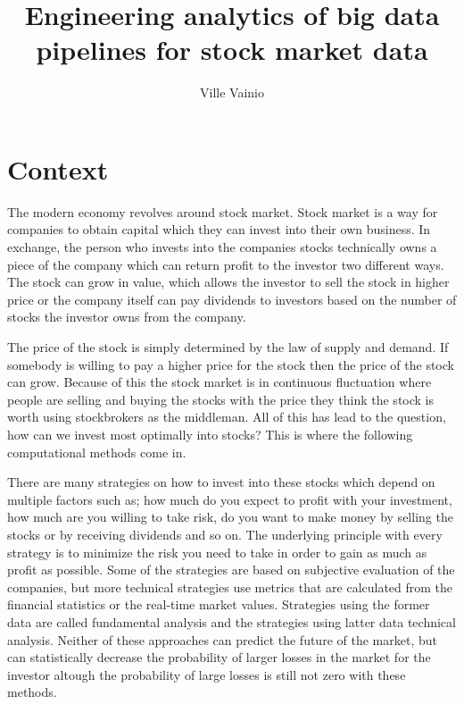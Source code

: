 \documentclass[article,11pt]{article}
\title{Engineering analytics of big data pipelines for stock market data}
\begin{document}
\author{Ville Vainio}
\maketitle

\section{Context}

The modern economy revolves around stock market.
Stock market is a way for companies to obtain capital which they can invest into their own business.
In exchange, the person who invests into the companies stocks technically owns a piece of the company which can return profit to the investor two different ways.
The stock can grow in value, which allows the investor to sell the stock in higher price or the company itself can pay dividends to investors based on the number of stocks the investor owns from the company.

The price of the stock is simply determined by the law of supply and demand. 
If somebody is willing to pay a higher price for the stock then the price of the stock can grow.
Because of this the stock market is in continuous fluctuation where people are selling and buying the stocks with the price they think the stock is worth using stockbrokers as the middleman. \cite{person}
All of this has lead to the question, how can we invest most optimally into stocks?
This is where the following computational methods come in. 

There are many strategies on how to invest into these stocks which depend on multiple factors such as; how much do you expect to profit with your investment, how much are you willing to take risk, do you want to make money by selling the stocks or by receiving dividends and so on.
The underlying principle with every strategy is to minimize the risk you need to take in order to gain as much as profit as possible.
Some of the strategies are based on subjective evaluation of the companies, but more technical strategies use metrics that are calculated from the financial statistics or the real-time market values.
Strategies using the former data are called fundamental analysis and the strategies using latter data technical analysis.
Neither of these approaches can predict the future of the market, but can statistically decrease the probability of larger losses in the market for the investor altough the probability of large losses is still not zero with these methods. \cite{fox}
\end{document}
